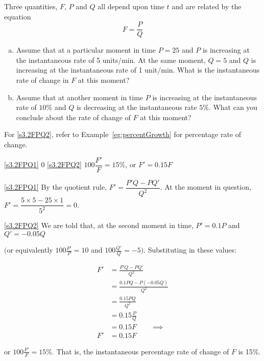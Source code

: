 \begin{question}[1997A]\label{s3.2relationshiplast}
Three quantities, $F$, $P$ and $Q$ all depend upon time
$t$ and are related by the equation
$$
F=\frac{P}{Q}
$$
\begin{enumerate}[(a)]
\item\label{s3.2FPQ1} Assume that at a particular moment in time $P=25$ and $P$
is increasing at the instantaneous rate of 5 units/min. At the same moment,
$Q=5$ and $Q$ is increasing at the instantaneous rate of 1 unit/min. What
is the instantaneous rate of change in $F$ at this moment?
\item\label{s3.2FPQ2} Assume that at another moment in time $P$ is increasing at
the instantaneous rate of $10\%$ and $Q$ is decreasing at the instantaneous
rate $5\%$. What can you conclude about the rate of change of $F$ at this
moment?
\end{enumerate}
\end{question}
\begin{hint} For \eqref{s3.2FPQ2}, refer to Example~\ref*{eg:percentGrowth} for percentage rate of change.
\end{hint}
\begin{answer}
\eqref{s3.2FPQ1} 0\qquad
\eqref{s3.2FPQ2} $100\dfrac{F'}{F}=15\%$, or $F'=0.15F$
\end{answer}
\begin{solution}
\eqref{s3.2FPQ1}
By the quotient rule, $F'=\dfrac{P'Q-PQ'}{Q^2}$. At the moment in question,
$F'=\dfrac{5\times5-25\times 1}{5^2}=0.$

\eqref{s3.2FPQ2}
We are told that, at the second moment in time,
$P'=0.1 P$  and $Q'=-0.05 Q$

 $\big($or equivalently $100\frac{P'}{P}=10$ and $100\frac{Q'}{Q}=-5\big)$. Substituting in these values:

\begin{align*}
F'&=\frac{P'Q-PQ'}{Q^2}\\
&=\frac{0.1PQ-P(-0.05Q)}{Q^2}\\
&=\frac{0.15PQ}{Q^2}\\
&=0.15\frac{P}{Q}\\
&=0.15 F\qquad
\implies\\
 F'&=0.15F\end{align*}

 or  $100\frac{F'}{F}=15\%$. That is, the instantaneous percentage rate of change of $F$ is 15\%.
\end{solution}





